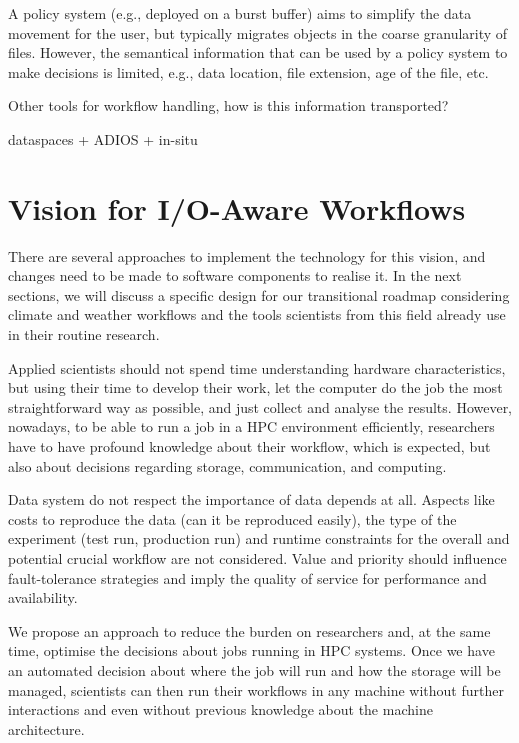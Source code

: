 \documentclass{superfri}
\newcommand{\jk}[1]{\todo[inline]{JK: #1}}
\begin{document}
A policy system (e.g., deployed on a burst buffer) aims to simplify the data movement for the user, but typically migrates objects in the coarse granularity of files.
However, the semantical information that can be used by a policy system to make decisions is limited, e.g., data location, file extension, age of the file, etc.

Other tools for workflow handling, how is this information transported?

dataspaces + ADIOS + in-situ

\jk{TODO}

\cite{Vladimirov2014FileIO}

\section{Vision for I/O-Aware Workflows}
\label{sec:vision}

There are several approaches to implement the technology for this vision, and changes need to be made to software components to realise it.
In the next sections, we will discuss a specific design for our transitional roadmap considering climate and weather workflows and the tools scientists from this field already use in their routine research.

Applied scientists should not spend time understanding hardware characteristics, but using their time to develop their work, let the computer do the job the most straightforward way as possible, and just collect and analyse the results.
However, nowadays, to be able to run a job in a HPC environment efficiently, researchers have to have profound knowledge about their workflow, which is expected, but also about decisions regarding storage, communication, and computing.

Data system do not respect the importance of data depends at all. Aspects like costs to reproduce the data (can it be reproduced easily), the type of the experiment (test run, production run) and runtime constraints for the overall and potential crucial workflow are not considered.
Value and priority should influence fault-tolerance strategies and imply the quality of service for performance and availability.

We propose an approach to reduce the burden on researchers and, at the same time, optimise the decisions about jobs running in HPC systems.
Once we have an automated decision about where the job will run and how the storage will be managed, scientists can then run their workflows in any machine without further interactions and even without previous knowledge about the machine architecture.
\end{document}
